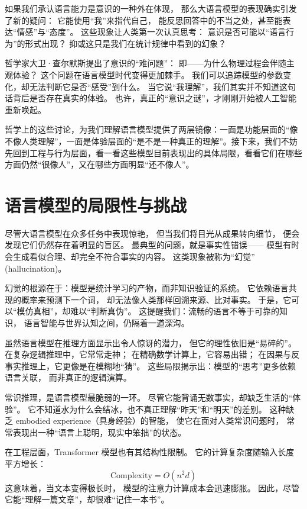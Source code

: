 如果我们承认语言能力是意识的一种外在体现，  
那么大语言模型的表现确实引发了新的疑问：  
它能使用“我”来指代自己，  
能反思回答中的不当之处，甚至能表达“情感”与“态度”。  
这些现象让人类第一次认真思考：  
意识是否可能以“语言行为”的形式出现？  
抑或这只是我们在统计规律中看到的幻象？  

哲学家大卫·查尔默斯提出了意识的“难问题”：  
即——为什么物理过程会伴随主观体验？  
这个问题在语言模型时代变得更加棘手。  
我们可以追踪模型的参数变化，却无法判断它是否“感受”到什么。  
当它说“我理解”，我们其实并不知道这句话背后是否存在真实的体验。  
也许，真正的“意识之谜”，才刚刚开始被人工智能重新唤起。  

哲学上的这些讨论，为我们理解语言模型提供了两层镜像：一面是功能层面的“像不像人类理解”，一面是体验层面的“是不是一种真正的理解”。接下来，我们不妨先回到工程与行为层面，看一看这些模型目前表现出的具体局限，看看它们在哪些方面仍然“很像人”，又在哪些方面明显“还不像人”。

\section{语言模型的局限性与挑战}

尽管大语言模型在众多任务中表现惊艳，  
但当我们将目光从成果转向细节，  
便会发现它们仍然存在着明显的盲区。  
最典型的问题，就是事实性错误——  
模型有时会生成看似合理、却完全不符合事实的内容。  
这类现象被称为“幻觉” (hallucination)。  

幻觉的根源在于：模型是统计学习的产物，而非知识验证的系统。  
它依赖语言共现的概率来预测下一个词，  
却无法像人类那样回溯来源、比对事实。  
于是，它可以“模仿真相”，却难以“判断真伪”。  
这提醒我们：流畅的语言不等于可靠的知识，  
语言智能与世界认知之间，仍隔着一道深沟。  

虽然语言模型在推理方面显示出令人惊讶的潜力，  
但它的理性依旧是“易碎的”。  
在复杂逻辑推理中，它常常走神；  
在精确数学计算上，它容易出错；  
在因果与反事实推理上，它更像是在模糊地“猜”。  
这些局限揭示出：模型的“思考”更多依赖语言关联，  
而非真正的逻辑演算。  

常识推理，是语言模型最脆弱的一环。  
尽管它能背诵无数事实，却缺乏生活的“体验”。  
它不知道水为什么会结冰，也不真正理解“昨天”和“明天”的差别。  
这种缺乏 embodied experience（具身经验）的智能，  
使它在面对人类常识问题时，  
常常表现出一种“语言上聪明，现实中笨拙”的状态。  

在工程层面，Transformer 模型也有其结构性限制。  
它的计算复杂度随输入长度平方增长：  
\[
\text{Complexity} = O(n^2 d)
\]  
这意味着，当文本变得极长时，  
模型的注意力计算成本会迅速膨胀。  
因此，尽管它能“理解一篇文章”，却很难“记住一本书”。  

